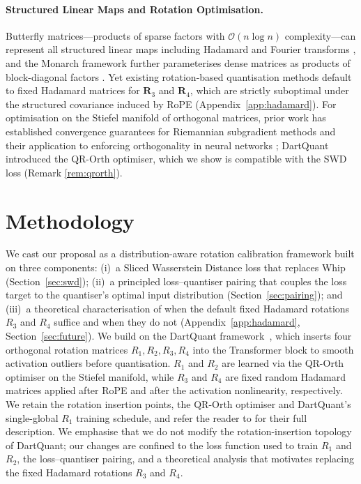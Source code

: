\documentclass[11pt,a4paper]{article}
\begin{document}
\paragraph{Structured Linear Maps and Rotation Optimisation.}
Butterfly matrices---products of sparse factors with $\mathcal{O}(n \log n)$ complexity---can represent all structured linear maps including Hadamard and Fourier transforms \citep{dao2020kaleidoscope}, and the Monarch framework further parameterises dense matrices as products of block-diagonal factors \citep{dao2022monarch}.
Yet existing rotation-based quantisation methods default to fixed Hadamard matrices for $\mathbf{R}_3$ and $\mathbf{R}_4$, which are strictly suboptimal under the structured covariance induced by RoPE \citep{su2024roformer} (Appendix~\ref{app:hadamard}).
For optimisation on the Stiefel manifold of orthogonal matrices, prior work has established convergence guarantees for Riemannian subgradient methods \citep{li2021riemannian} and their application to enforcing orthogonality in neural networks \citep{trockman2021}; DartQuant \citep{dartquant} introduced the QR-Orth optimiser, which we show is compatible with the SWD loss (Remark \ref{rem:qrorth}).

\section{Methodology}
\label{sec:method}

We cast our proposal as a distribution-aware rotation calibration framework built on three components: (i)~a Sliced Wasserstein Distance loss that replaces Whip (Section~\ref{sec:swd}); (ii)~a principled loss--quantiser pairing that couples the loss target to the quantiser's optimal input distribution (Section~\ref{sec:pairing}); and (iii)~a theoretical characterisation of when the default fixed Hadamard rotations $R_3$ and $R_4$ suffice and when they do not (Appendix~\ref{app:hadamard}, Section~\ref{sec:future}).
We build on the DartQuant framework~\cite{dartquant}, which inserts four orthogonal rotation matrices $R_1, R_2, R_3, R_4$ into the Transformer block to smooth activation outliers before quantisation.
$R_1$ and $R_2$ are learned via the QR-Orth optimiser on the Stiefel manifold, while $R_3$ and $R_4$ are fixed random Hadamard matrices applied after RoPE and after the activation nonlinearity, respectively.
We retain the rotation insertion points, the QR-Orth optimiser and DartQuant's single-global $R_1$ training schedule, and refer the reader to \citet{dartquant} for their full description.
We emphasise that we do not modify the rotation-insertion topology of DartQuant; our changes are confined to the loss function used to train $R_1$ and $R_2$, the loss--quantiser pairing, and a theoretical analysis that motivates replacing the fixed Hadamard rotations $R_3$ and $R_4$.
\end{document}
